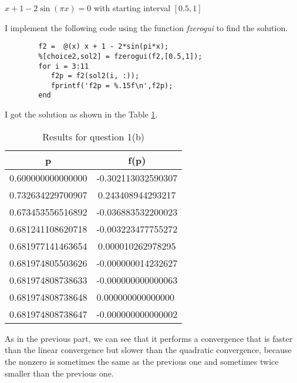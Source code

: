 \begin{question}
    $x+1-2\sin(\pi x) = 0$ with starting interval $[0.5,1]$
\end{question}

\begin{answer}
    I implement the following code using the function \textit{fzerogui} to find the solution.
    \begin{verbatim}
        f2 =  @(x) x + 1 - 2*sin(pi*x);
        %[choice2,sol2] = fzerogui(f2,[0.5,1]);
        for i = 3:11
           f2p = f2(sol2(i, :));
           fprintf('f2p = %.15f\n',f2p);
        end
    \end{verbatim}
    I got the solution as shown in the Table \ref{tab:tab2}.
    \begin{table}[H]
        \centering
        \caption{Results for question 1(b)}
        \label{tab:tab2}
        \begin{tabular}{c|c}
            \textbf{p}                             & \textbf{f(p)}                          \\ \hline
            0.600000000000000                      & -0.302113032590307                     \\ \hline
            0.732634229700907                      & 0.243408944293217                      \\ \hline
            0.673453556516892                      & -0.036883532200023                     \\ \hline
            0.681241108620718                      & -0.003223477755272                     \\ \hline
            0.681977141463654                      & 0.000010262978295                      \\ \hline
            \multicolumn{1}{l|}{0.681974805503626} & \multicolumn{1}{l}{-0.000000014232627} \\ \hline
            0.681974808738633                      & -0.000000000000063                     \\ \hline
            \multicolumn{1}{l|}{0.681974808738648} & \multicolumn{1}{l}{0.000000000000000}  \\ \hline
            \multicolumn{1}{l|}{0.681974808738647} & \multicolumn{1}{l}{-0.000000000000002}
        \end{tabular}
    \end{table}
    As in the previous part, we can see that it performs a convergence that is faster than the linear convergence but slower than the quadratic convergence, because the nonzero is sometimes the same as the previous one and sometimes twice smaller than the previous one.
\end{answer}    
